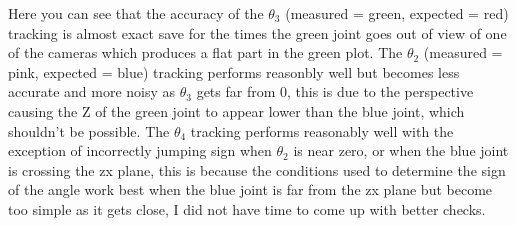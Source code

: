 \documentclass[12pt]{article}
\begin{document}
Here you can see that the accuracy of the $\theta_3$ (measured = green, expected = red) tracking is almost exact save for the times the green joint goes out of view of one of the cameras which produces a flat part in the green plot.\newline\newline
The $\theta_2$ (measured = pink, expected = blue) tracking performs reasonbly well but becomes less accurate and more noisy as $\theta_3$ gets far from 0, this is due to the perspective causing the Z of the green joint to appear lower than the blue joint, which shouldn't be possible.\newline\newline
The $\theta_4$ tracking performs reasonably well with the exception of incorrectly jumping sign when $\theta_2$ is near zero, or when the blue joint is crossing the zx plane, this is because the conditions used to determine the sign of the angle work best when the blue joint is far from the zx plane but become too simple as it gets close, I did not have time to come up with better checks.\newpage
\end{document}
